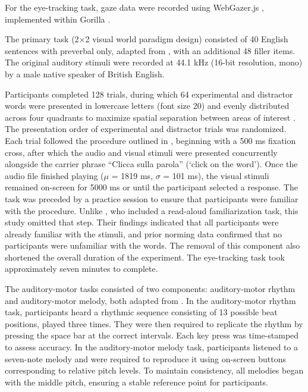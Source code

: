 For the eye-tracking task, gaze data were recorded using WebGazer.js \citep{Papoutsaki}, implemented within Gorilla \citep{Anwyl-Irvine_2019}. 

The primary task (2×2 visual world paradigm design) consisted of 40 English sentences with preverbal only, adapted from \cite{Ge_etal_2021}, with an additional 48 filler items. The original auditory stimuli were recorded at 44.1 kHz (16-bit resolution, mono) by a male native speaker of British English.

Participants completed 128 trials, during which 64 experimental and distractor words were presented in lowercase letters (font size 20) and evenly distributed across four quadrants to maximize spatial separation between areas of interest \citep{bramlett_wiener_24-AOW}. The presentation order of experimental and distractor trials was randomized. Each trial followed the procedure outlined in \cite{Ge_et_al}, beginning with a 500 ms fixation cross, after which the audio and visual stimuli were presented concurrently alongside the carrier phrase “Clicca sulla parola” (‘click on the word’). Once the audio file finished playing ($\mu$ = 1819 ms, $\sigma$ = 101 ms), the visual stimuli remained on-screen for 5000 ms or until the participant selected a response. The task was preceded by a practice session to ensure that participants were familiar with the procedure. Unlike \cite{Ge_et_al}, who included a read-aloud familiarization task, this study omitted that step. Their findings indicated that all participants were already familiar with the stimuli, and prior norming data confirmed that no participants were unfamiliar with the words. The removal of this component also shortened the overall duration of the experiment. The eye-tracking task took approximately seven minutes to complete.

The auditory-motor tasks consisted of two components: auditory-motor rhythm and auditory-motor melody, both adapted from \citep{Kachlicka_Saito_Tierney_2019}. In the auditory-motor rhythm task, participants heard a rhythmic sequence consisting of 13 possible beat positions, played three times. They were then required to replicate the rhythm by pressing the space bar at the correct intervals. Each key press was time-stamped to assess accuracy. In the auditory-motor melody task, participants listened to a seven-note melody and were required to reproduce it using on-screen buttons corresponding to relative pitch levels. To maintain consistency, all melodies began with the middle pitch, ensuring a stable reference point for participants.

